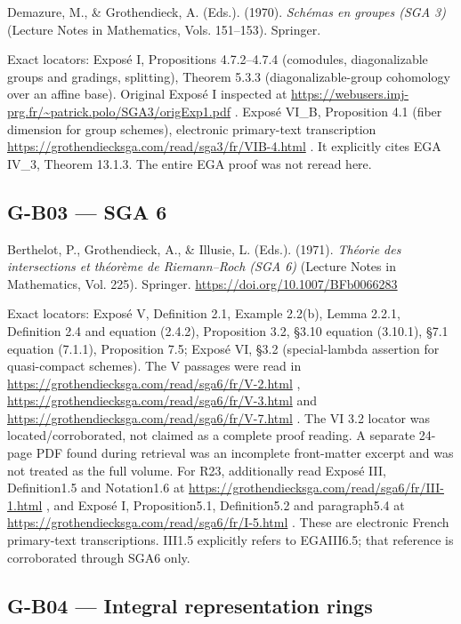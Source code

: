 \documentclass[11pt,a4paper]{article}
\theoremstyle{definition}\newtheorem{definition}{Definition}
\begin{document}
Demazure, M., \& Grothendieck, A. (Eds.). (1970). \emph{Schémas en
groupes (SGA 3)} (Lecture Notes in Mathematics, Vols. 151--153).
Springer.

Exact locators: Exposé I, Propositions 4.7.2--4.7.4 (comodules,
diagonalizable groups and gradings, splitting), Theorem 5.3.3
(diagonalizable-group cohomology over an affine base). Original Exposé I
inspected at
\url{https://webusers.imj-prg.fr/~patrick.polo/SGA3/origExp1.pdf} .
Exposé VI\_B, Proposition 4.1 (fiber dimension for group schemes),
electronic primary-text transcription
\url{https://grothendiecksga.com/read/sga3/fr/VIB-4.html} . It
explicitly cites EGA IV\_3, Theorem 13.1.3. The entire EGA proof was not
reread here.

\subsection{G-B03 --- SGA 6}\label{g-b03--sga-6}

Berthelot, P., Grothendieck, A., \& Illusie, L. (Eds.). (1971).
\emph{Théorie des intersections et théorème de Riemann--Roch (SGA 6)}
(Lecture Notes in Mathematics, Vol. 225). Springer.
\url{https://doi.org/10.1007/BFb0066283}

Exact locators: Exposé V, Definition 2.1, Example 2.2(b), Lemma 2.2.1,
Definition 2.4 and equation (2.4.2), Proposition 3.2, §3.10 equation
(3.10.1), §7.1 equation (7.1.1), Proposition 7.5; Exposé VI, §3.2
(special-lambda assertion for quasi-compact schemes). The V passages
were read in \url{https://grothendiecksga.com/read/sga6/fr/V-2.html} ,
\url{https://grothendiecksga.com/read/sga6/fr/V-3.html} and
\url{https://grothendiecksga.com/read/sga6/fr/V-7.html} . The VI 3.2
locator was located/corroborated, not claimed as a complete proof
reading. A separate 24-page PDF found during retrieval was an incomplete
front-matter excerpt and was not treated as the full volume. For R23,
additionally read Exposé III, Definition1.5 and Notation1.6 at
\url{https://grothendiecksga.com/read/sga6/fr/III-1.html} , and Exposé
I, Proposition5.1, Definition5.2 and paragraph5.4 at
\url{https://grothendiecksga.com/read/sga6/fr/I-5.html} . These are
electronic French primary-text transcriptions. III1.5 explicitly refers
to EGAIII6.5; that reference is corroborated through SGA6 only.

\subsection{G-B04 --- Integral representation
rings}\label{g-b04--integral-representation-rings}
\end{document}
